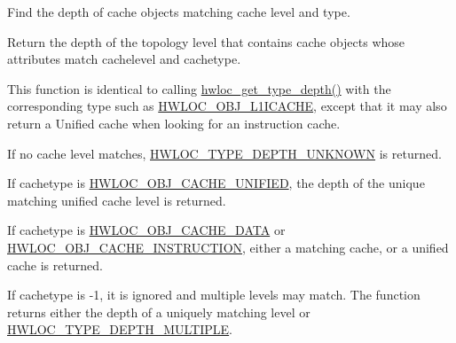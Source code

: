 Find the depth of cache objects matching cache level and type. 

Return the depth of the topology level that contains cache objects whose attributes match {\ttfamily cachelevel} and {\ttfamily cachetype}.

This function is identical to calling \hyperlink{a00187_ga8bec782e21be313750da70cf7428b374}{hwloc\+\_\+get\+\_\+type\+\_\+depth()} with the corresponding type such as \hyperlink{a00184_ggacd37bb612667dc437d66bfb175a8dc55afa834a85d9e53836cf0db6d0bd8329b4}{H\+W\+L\+O\+C\+\_\+\+O\+B\+J\+\_\+\+L1\+I\+C\+A\+C\+HE}, except that it may also return a Unified cache when looking for an instruction cache.

If no cache level matches, \hyperlink{a00187_ggaf4e663cf42bbe20756b849c6293ef575a0565ab92ab72cb0cec91e23003294aad}{H\+W\+L\+O\+C\+\_\+\+T\+Y\+P\+E\+\_\+\+D\+E\+P\+T\+H\+\_\+\+U\+N\+K\+N\+O\+WN} is returned.

If {\ttfamily cachetype} is \hyperlink{a00184_gga791c9875c8fe20f3e1e5871e0657e59ba3900b3b2db54941aac249e5a638a2d7a}{H\+W\+L\+O\+C\+\_\+\+O\+B\+J\+\_\+\+C\+A\+C\+H\+E\+\_\+\+U\+N\+I\+F\+I\+ED}, the depth of the unique matching unified cache level is returned.

If {\ttfamily cachetype} is \hyperlink{a00184_gga791c9875c8fe20f3e1e5871e0657e59bacac60ecad4206f85aeb79bef1604b488}{H\+W\+L\+O\+C\+\_\+\+O\+B\+J\+\_\+\+C\+A\+C\+H\+E\+\_\+\+D\+A\+TA} or \hyperlink{a00184_gga791c9875c8fe20f3e1e5871e0657e59ba6f98b0d422b38ba90c5f5c79a11b0658}{H\+W\+L\+O\+C\+\_\+\+O\+B\+J\+\_\+\+C\+A\+C\+H\+E\+\_\+\+I\+N\+S\+T\+R\+U\+C\+T\+I\+ON}, either a matching cache, or a unified cache is returned.

If {\ttfamily cachetype} is {\ttfamily -\/1}, it is ignored and multiple levels may match. The function returns either the depth of a uniquely matching level or \hyperlink{a00187_ggaf4e663cf42bbe20756b849c6293ef575ae99465995cacde6c210d5fc2e409798c}{H\+W\+L\+O\+C\+\_\+\+T\+Y\+P\+E\+\_\+\+D\+E\+P\+T\+H\+\_\+\+M\+U\+L\+T\+I\+P\+LE}. \mbox{\label{a00199_ga36f48c32837c7a70b424706e213dcd71}} 
